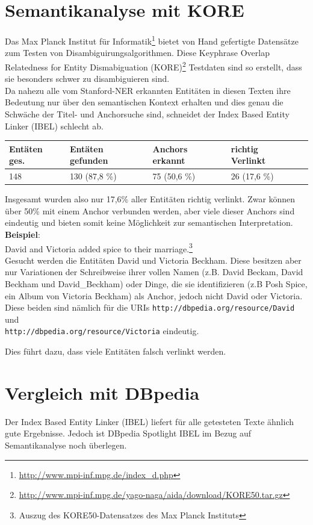 \documentclass[11pt, a4paper, oneside]{Thesis} %
\begin{document}
\section{Semantikanalyse mit KORE}
Das Max Planck Institut f\"ur Informatik\footnote{\url{http://www.mpi-inf.mpg.de/index\_d.php}} bietet von Hand gefertigte Datens\"atze zum Testen von Disambiguirungsalgorithmen. Diese Keyphrase Overlap Relatedness for Entity Dismabiguation (KORE)\footnote{\url{http://www.mpi-inf.mpg.de/yago-naga/aida/download/KORE50.tar.gz}} Testdaten sind so erstellt, dass sie besonders schwer zu disambiguieren sind. \\
Da nahezu alle vom Stanford-NER erkannten Entit\"aten in diesen Texten ihre Bedeutung nur \"uber den semantischen Kontext erhalten und dies genau die Schw\"ache der Titel- und Anchorsuche sind, schneidet der Index Based Entity Linker (IBEL) schlecht ab. 
\begin{center}
\begin{tabular}{|l|l|l|l|l|}
\hline
Ent\"aten ges. & Ent\"aten gefunden & Anchors erkannt & richtig Verlinkt  \\
\hline
148 & 130 (87,8 \%) & 75 (50,6 \%) & 26 (17,6 \%) \\
\hline
\end{tabular}
\end{center}

Insgesamt wurden also nur 17,6\% aller Entit\"aten richtig verlinkt. Zwar k\"onnen  \"uber 50\% mit einem Anchor verbunden werden, aber viele dieser Anchors sind eindeutig und bieten somit keine M\"oglichkeit zur semantischen Interpretation.\\
\textbf{Beispiel}:\\
David and Victoria added spice to their marriage.\footnote{Auszug des KORE50-Datensatzes des Max Planck Instituts} \\
Gesucht werden die Entit\"aten David und Victoria Beckham. Diese besitzen aber nur Variationen der Schreibweise ihrer vollen Namen (z.B. David Beckam, David Beckham und David\_Beckham) oder Dinge, die sie identifizieren (z.B Posh Spice, ein Album von Victoria Beckham) als Anchor, jedoch nicht David oder Victoria. Diese beiden sind n\"amlich f\"ur die URIs \texttt{http://dbpedia.org/resource/David} und \\ \texttt{http://dbpedia.org/resource/Victoria} eindeutig.

Dies f\"uhrt dazu, dass viele Entit\"aten falsch verlinkt werden.
\clearpage
\section{Vergleich mit DBpedia}
Der Index Based Entity Linker (IBEL) liefert f\"ur alle getesteten Texte \"ahnlich gute Ergebnisse. Jedoch ist DBpedia Spotlight IBEL im Bezug auf Semantikanalyse noch \"uberlegen.
\end{document}

